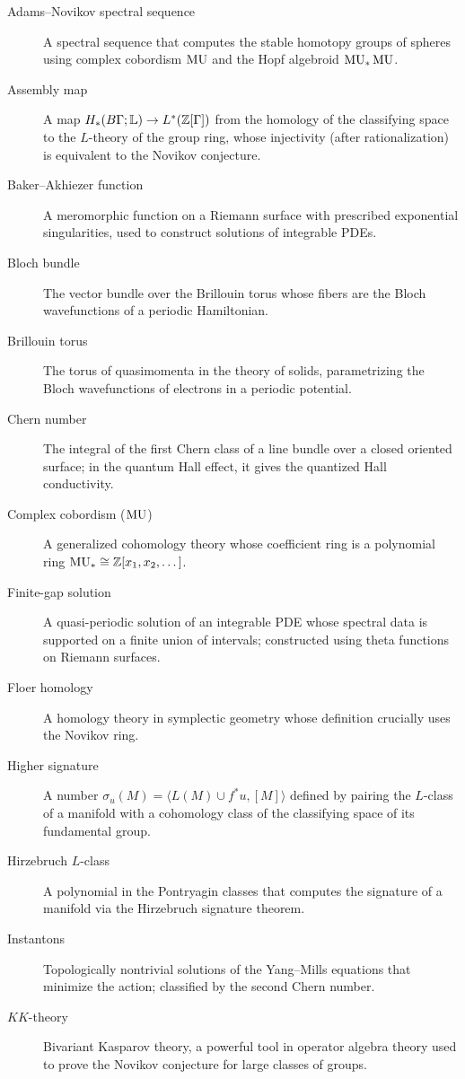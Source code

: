 \begin{description}
    \item[Adams--Novikov spectral sequence] A spectral sequence that computes the stable homotopy groups of spheres using complex cobordism \(\operatorname{MU}\) and the Hopf algebroid \(\operatorname{MU}_*\operatorname{MU}\).
    \item[Assembly map] A map \(H_*(B\Gamma; \mathbb{L}) \to L^*(\mathbb{Z}[\Gamma])\) from the homology of the classifying space to the \(L\)-theory of the group ring, whose injectivity (after rationalization) is equivalent to the Novikov conjecture.
    \item[Baker--Akhiezer function] A meromorphic function on a Riemann surface with prescribed exponential singularities, used to construct solutions of integrable PDEs.
    \item[Bloch bundle] The vector bundle over the Brillouin torus whose fibers are the Bloch wavefunctions of a periodic Hamiltonian.
    \item[Brillouin torus] The torus of quasimomenta in the theory of solids, parametrizing the Bloch wavefunctions of electrons in a periodic potential.
    \item[Chern number] The integral of the first Chern class of a line bundle over a closed oriented surface; in the quantum Hall effect, it gives the quantized Hall conductivity.
    \item[Complex cobordism (\(\operatorname{MU}\))] A generalized cohomology theory whose coefficient ring is a polynomial ring \(\operatorname{MU}_* \cong \mathbb{Z}[x_1, x_2, \dots]\).
    \item[Finite-gap solution] A quasi-periodic solution of an integrable PDE whose spectral data is supported on a finite union of intervals; constructed using theta functions on Riemann surfaces.
    \item[Floer homology] A homology theory in symplectic geometry whose definition crucially uses the Novikov ring.
    \item[Higher signature] A number \(\sigma_u(M) = \langle L(M) \cup f^* u, [M] \rangle\) defined by pairing the \(L\)-class of a manifold with a cohomology class of the classifying space of its fundamental group.
    \item[Hirzebruch \(L\)-class] A polynomial in the Pontryagin classes that computes the signature of a manifold via the Hirzebruch signature theorem.
    \item[Instantons] Topologically nontrivial solutions of the Yang--Mills equations that minimize the action; classified by the second Chern number.
    \item[\(KK\)-theory] Bivariant Kasparov theory, a powerful tool in operator algebra theory used to prove the Novikov conjecture for large classes of groups.

\end{description}
